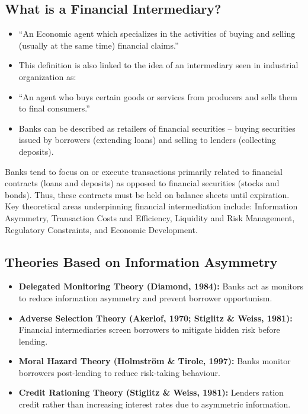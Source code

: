 \newpage



\subsection*{What is a Financial Intermediary?}

\begin{itemize}
    \item ``An Economic agent which specializes in the activities of buying and selling (usually at the same time) financial claims.''
    \item This definition is also linked to the idea of an intermediary seen in industrial organization as:
    \item ``An agent who buys certain goods or services from producers and sells them to final consumers.''
    \item Banks can be described as retailers of financial securities – buying securities issued by borrowers (extending loans) and selling to lenders (collecting deposits).
\end{itemize}

Banks tend to focus on or execute transactions primarily related to financial contracts (loans and deposits) as opposed to financial securities (stocks and bonds). Thus, these contracts must be held on balance sheets until expiration. Key theoretical areas underpinning financial intermediation include: Information Asymmetry, Transaction Costs and Efficiency, Liquidity and Risk Management, Regulatory Constraints, and Economic Development.

\subsection{Theories Based on Information Asymmetry}
\begin{itemize}
    \item \textbf{Delegated Monitoring Theory (Diamond, 1984):} Banks act as monitors to reduce information asymmetry and prevent borrower opportunism.
    \item \textbf{Adverse Selection Theory (Akerlof, 1970; Stiglitz \& Weiss, 1981):} Financial intermediaries screen borrowers to mitigate hidden risk before lending.
    \item \textbf{Moral Hazard Theory (Holmström \& Tirole, 1997):} Banks monitor borrowers post-lending to reduce risk-taking behaviour.
    \item \textbf{Credit Rationing Theory (Stiglitz \& Weiss, 1981):} Lenders ration credit rather than increasing interest rates due to asymmetric information.
\end{itemize}

